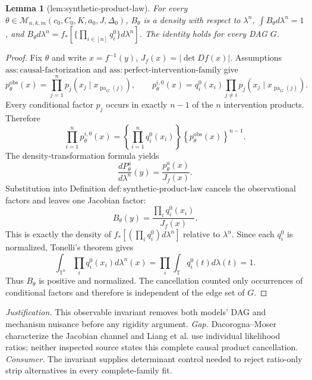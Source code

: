 \documentclass{article}
\newtheorem{lemma}{Lemma}
\begin{document}
\begin{lemma}[lem:synthetic-product-law]\label{lem:synthetic-product-law}
For every \(\theta\in\mathcal M_{n,k,m}(c_0,C_0,K,a_0,J,\Delta_0)\), \(B_\theta\) is a density with respect to \(\lambda^n\), \(\int B_\theta d\lambda^n=1\), and \(B_\theta d\lambda^n=f_*[\{\prod_{i\in[n]}q_i^0\}d\lambda^n]\). The identity holds for every DAG \(G\).
\end{lemma}
\begin{proof}
Fix \(\theta\) and write \(x=f^{-1}(y)\), \(J_f(x)=|\det Df(x)|\). Assumptions \(\mathrm{ass:causal\text{-}factorization}\) and \(\mathrm{ass:perfect\text{-}intervention\text{-}family}\) give
\[
p_\theta^{\mathrm{obs}}(x)=\prod_{j=1}^n p_j(x_j\mid x_{\operatorname{pa}_G(j)}),
\qquad
p_\theta^{i,0}(x)=q_i^0(x_i)\prod_{j\ne i}p_j(x_j\mid x_{\operatorname{pa}_G(j)}).
\]
Every conditional factor \(p_j\) occurs in exactly \(n-1\) of the \(n\) intervention products. Therefore
\[
\prod_{i=1}^n p_\theta^{i,0}(x)
=\left\{\prod_{i=1}^nq_i^0(x_i)\right\}
 \left\{p_\theta^{\mathrm{obs}}(x)\right\}^{n-1}.
\]
The density-transformation formula yields
\[
\frac{dP_\theta^a}{d\lambda^n}(y)
=\frac{p_\theta^a(x)}{J_f(x)}.
\]
Substitution into Definition \(\mathrm{def:synthetic\text{-}product\text{-}law}\) cancels the observational factors and leaves one Jacobian factor:
\[
B_\theta(y)
=\frac{\prod_iq_i^0(x_i)}{J_f(x)}.
\]
This is exactly the density of
\(f_*[(\prod_iq_i^0)d\lambda^n]\) relative to \(\lambda^n\). Since each \(q_i^0\) is normalized, Tonelli's theorem gives
\[
\int_{\mathbb T^n}\prod_iq_i^0(x_i)d\lambda^n(x)
=\prod_i\int_{\mathbb T}q_i^0(t)d\lambda(t)=1.
\]
Thus \(B_\theta\) is positive and normalized. The cancellation counted only occurrences of conditional factors and therefore is independent of the edge set of \(G\).
\end{proof}
\par\smallskip\noindent \textit{Justification.} This observable invariant removes both models' DAG and mechanism nuisance before any rigidity argument. \textit{Gap.} Dacorogna--Moser characterize the Jacobian channel and Liang et al. use individual likelihood ratios; neither inspected source states this complete causal product cancellation. \textit{Consumer.} The invariant supplies determinant control needed to reject ratio-only strip alternatives in every complete-family fit.
\end{document}
